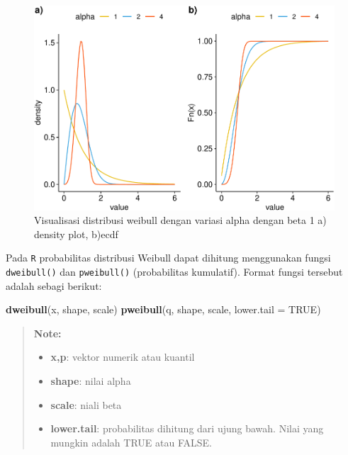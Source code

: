 \documentclass[]{book}
\newenvironment{Shaded}{\begin{snugshade}}{\end{snugshade}}
\newcommand{\KeywordTok}[1]{\textcolor[rgb]{0.13,0.29,0.53}{\textbf{#1}}}
\newcommand{\DataTypeTok}[1]{\textcolor[rgb]{0.13,0.29,0.53}{#1}}
\newcommand{\OtherTok}[1]{\textcolor[rgb]{0.56,0.35,0.01}{#1}}
\newcommand{\NormalTok}[1]{#1}
\providecommand{\tightlist}{%
  \setlength{\itemsep}{0pt}\setlength{\parskip}{0pt}}
\begin{document}
\begin{figure}

{\centering \includegraphics[width=0.9\linewidth]{EnvStat_files/figure-latex/weibullvis-1} 

}

\caption{Visualisasi distribusi weibull dengan variasi alpha dengan beta 1 a) density plot, b)ecdf}\label{fig:weibullvis}
\end{figure}

Pada \texttt{R} probabilitas distribusi Weibull dapat dihitung
menggunakan fungsi \texttt{dweibull()} dan \texttt{pweibull()}
(probabilitas kumulatif). Format fungsi tersebut adalah sebagi berikut:

\begin{Shaded}
\begin{Highlighting}[]
\KeywordTok{dweibull}\NormalTok{(x, shape, scale)}
\KeywordTok{pweibull}\NormalTok{(q, shape, scale, }\DataTypeTok{lower.tail =} \OtherTok{TRUE}\NormalTok{)}
\end{Highlighting}
\end{Shaded}

\begin{quote}
\textbf{Note: }

\begin{itemize}
\tightlist
\item
  \textbf{x,p}: vektor numerik atau kuantil
\item
  \textbf{shape}: nilai alpha
\item
  \textbf{scale}: niali beta
\item
  \textbf{lower.tail}: probabilitas dihitung dari ujung bawah. Nilai
  yang mungkin adalah TRUE atau FALSE.
\end{itemize}
\end{quote}
\end{document}
